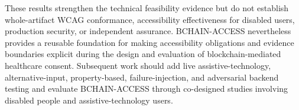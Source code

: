 \documentclass[journal]{IEEEtran}
\begin{document}
These results strengthen the technical feasibility evidence but do not establish whole-artifact WCAG conformance, accessibility effectiveness for disabled users, production security, or independent assurance. BCHAIN-ACCESS nevertheless provides a reusable foundation for making accessibility obligations and evidence boundaries explicit during the design and evaluation of blockchain-mediated healthcare consent. Subsequent work should add live assistive-technology, alternative-input, property-based, failure-injection, and adversarial backend testing and evaluate BCHAIN-ACCESS through co-designed studies involving disabled people and assistive-technology users.



\end{document}
